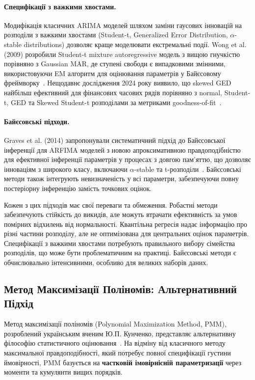 \documentclass[12pt,a4paper]{article}
\begin{document}
\paragraph{Специфікації з важкими хвостами.} Модифікація класичних ARIMA моделей шляхом заміни гаусових інновацій на розподіли з важкими хвостами (Student-t, Generalized Error Distribution, $\alpha$-stable distributions) дозволяє краще моделювати екстремальні події. Wong et al. (2009) розробили Student-t mixture autoregressive модель з вищою гнучкістю порівняно з Gaussian MAR, де ступені свободи є випадковими змінними, використовуючи EM алгоритм для оцінювання параметрів у Байєсовому фреймворку~\cite{wong2009student}. Нещодавнє дослідження 2024 року виявило, що skewed GED найбільш ефективний для фінансових часових рядів порівняно з normal, Student-t, GED та Skewed Student-t розподілами за метриками goodness-of-fit~\cite{palacios2024comparative}.

\paragraph{Байєсовські підходи.} Graves et al. (2014) запропонували систематичний підхід до Байєсовської інференції для ARFIMA моделей з новою апроксимативною правдоподібністю для ефективної інференції параметрів у процесах з довгою пам'яттю, що дозволяє інноваціям з широкого класу, включаючи $\alpha$-stable та t-розподіли~\cite{graves2014efficient}. Байєсовські методи також інтегрують невизначеність у всі параметри, забезпечуючи повну постеріорну інференцію замість точкових оцінок.

Кожен з цих підходів має свої переваги та обмеження. Робастні методи забезпечують стійкість до викидів, але можуть втрачати ефективність за умов помірних відхилень від нормальності. Квантільна регресія надає інформацію про різні частини розподілу, але не оптимізована для центральних оцінок параметрів. Специфікації з важкими хвостами потребують правильного вибору сімейства розподілів, що може бути проблематичним на практиці. Байєсовські методи є обчислювально інтенсивними, особливо для великих наборів даних.

\subsection{Метод Максимізації Поліномів: Альтернативний Підхід}
\label{subsec:pmm_intro}

Метод максимізації поліномів (Polynomial Maximization Method, PMM), розроблений українським вченим Ю.П. Кунченко, представляє альтернативну філософію статистичного оцінювання~\cite{kunchenko1991estimation,kunchenko2002polynomial}. На відміну від класичного методу максимальної правдоподібності, який потребує повної специфікації густини ймовірності, PMM базується на \textbf{частковій імовірнісній параметризації} через моменти та кумулянти вищих порядків.
\end{document}
